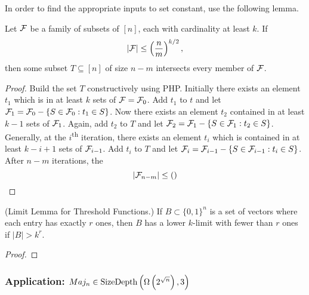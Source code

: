 \documentclass[11pt]{article}
\begin{document}
 	In order to find the appropriate inputs to set constant, use the following lemma.
 	\begin{lemma}
 		\label{lem:FindingOverlappingSet}
 		Let $\mathcal{F}$ be a family of subsets of $[n]$, each with cardinality at least $k$. If 
 		\[|\mathcal{F}| \leq \left(\frac{n}{m}\right)^{k/2},\]
 		then some subset $T \subseteq [n]$ of size $n-m$ intersects every member of $\mathcal{F}$. 
 	\end{lemma}
 	\begin{proof}
 		Build the set $T$ constructively using PHP. Initially there exists an element $t_1$ which is in at least $k$ sets of $\mathcal{F} = \mathcal{F}_0$. Add $t_1$ to $t$ and let $\mathcal{F}_1 = \mathcal{F}_{0} - \{S \in \mathcal{F}_{0}: t_1 \in S\}$. Now there exists an element $t_2$ contained in at least $k-1$ sets of $\mathcal{F}_{1}$. Again, add $t_2$ to $T$ and let $\mathcal{F}_{2} = \mathcal{F}_1 - \{S \in \mathcal{F}_1: t_2 \in S\}$. Generally, at the $i$\textsuperscript{th} iteration, there exists an element $t_i$ which is contained in at least $k-i+1$ sets of $\mathcal{F}_{i-1}$. Add $t_i$ to $T$ and let $\mathcal{F}_{i} = \mathcal{F}_{i-1} - \{S \in \mathcal{F}_{i-1}: t_i \in S\}$. After $n-m$ iterations, the 
 		\[|\mathcal{F}_{n-m}| \leq \left(\right)\]
 	\end{proof}
 
  	\begin{lemma}{(Limit Lemma for Threshold Functions.)}
 	\label{lem:LimitLemForThreshold} 
 	If $B \subset\{0,1\}^{n}$ is a set of vectors where each entry has exactly $r$ ones, then $B$ has a lower $k$-limit with fewer than $r$ ones if $|B| > k^r$. 
 	\end{lemma}
 	\begin{proof}
 		
 	\end{proof}
 
 	\subsubsection{Application: \texorpdfstring{$Maj_n \in \mathrm{SizeDepth}\left(\Omega\left(2^{\sqrt{n}}\right), 3\right)$}{Majn in SizeDepth(Omega(2^(sqrt(n)))))}}
\end{document}
